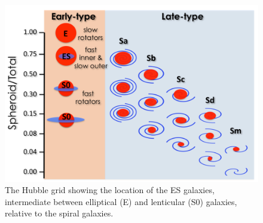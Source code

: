 \documentclass[useAMS,usenatbib,article]{mnras}
\begin{document}
\begin{figure}
\begin{center}
\includegraphics[width=\columnwidth]{Hubblegrid.pdf}
\caption{The Hubble grid showing the location of the ES galaxies, intermediate between
elliptical (E) and lenticular (S0) galaxies, relative to the spiral galaxies.  }
\label{fig:grid}
\end{center}
\end{figure}
\end{document}
